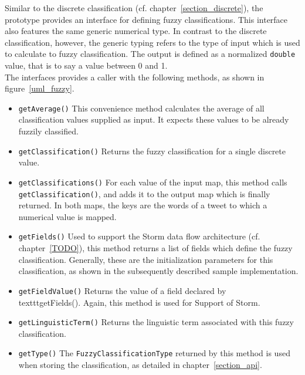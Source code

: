 \documentclass[a4paper]{article}
\begin{document}
Similar to the discrete classification (cf. chapter~\ref{section_discrete}), the prototype provides an interface for defining fuzzy classifications. This interface also features the same generic numerical type. In contrast to the discrete classification, however, the generic typing refers to the type of input which is used to calculate to fuzzy classification. The output is defined as a normalized \texttt{double} value, that is to say a value between 0 and 1.\\
The interfaces provides a caller with the following methods, as shown in figure~\ref{uml_fuzzy}.
\begin{itemize}
\item \texttt{getAverage()} This convenience method calculates the average of all classification values supplied as input. It expects these values to be already fuzzily classified.
\item \texttt{getClassification()} Returns the fuzzy classification for a single discrete value.
\item \texttt{getClassifications()} For each value of the input map, this method calls \texttt{getClassification()}, and adds it to the output map which is finally returned. In both maps, the keys are the words of a tweet to which a numerical value is mapped.
\item \texttt{getFields()} Used to support the Storm data flow architecture (cf. chapter~\ref{TODO}), this method returns a list of fields which define the fuzzy classification. Generally, these are the initialization parameters for this classification, as shown in the subsequently described sample implementation.
\item \texttt{getFieldValue()} Returns the value of a field declared by \\texttt{getFields()}. Again, this method is used for Support of Storm.
\item \texttt{getLinguisticTerm()} Returns the linguistic term associated with this fuzzy classification.
\item \texttt{getType()} The \texttt{FuzzyClassificationType} returned by this method is used when storing the classification, as detailed in chapter~\ref{section_api}.
\end{itemize}
\end{document}
